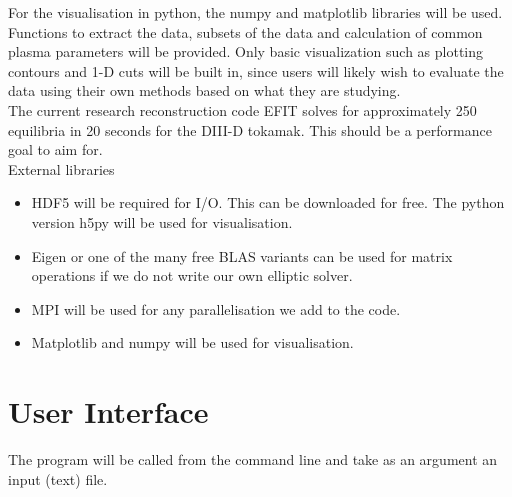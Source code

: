 \documentclass[paper=a4, fontsize=11pt]{scrartcl} %
\begin{document}
For the visualisation in python, the numpy and matplotlib libraries will be used. Functions to extract the data, subsets of the data and calculation of common plasma parameters will be provided. Only basic visualization such as plotting contours and 1-D cuts will be built in, since users will likely wish to evaluate the data using their own methods based on what they are studying. \\

The current research reconstruction code EFIT solves for approximately 250 equilibria in 20 seconds for the DIII-D tokamak. This should be a performance goal to aim for. \\

External libraries
\begin{itemize}
\item HDF5 will be required for I/O. This can be downloaded for free. The python version h5py will be used for visualisation.
\item Eigen or one of the many free BLAS variants can be used for matrix operations if we do not write our own elliptic solver.
\item MPI will be used for any parallelisation we add to the code. 
\item Matplotlib and numpy will be used for visualisation.
\end{itemize}


\section{User Interface}

The program will be called from the command line and take as an argument an input (text) file. 
\end{document}
